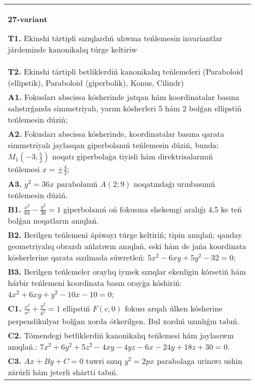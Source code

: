 \documentclass{article}
\begin{document}
\begin{tabular}{m{17cm}}
\textbf{27-variant}
\newline

\textbf{T1.} Ekinshi tártipli sızıqlardıń ulıwma teńlemesin invariantlar járdeminde kanonikalıq túrge keltiriw \\
\textbf{T2.} Ekinshi tártipli betliklerdiń kanonikalıq teńlemeleri (Paraboloid (ellipstik), Paraboloid (giperbolik), Konus, Cilindr) \\
\textbf{A1.} Fokusları abscissa kósherinde jatqan hám koordinatalar basına salıstırǵanda simmetriyalı, yarım kósherleri 5 hám 2 bolǵan ellipstiń teńlemesin dúziń; \\
\textbf{A2.} Fokusları abscissa kósherinde, koordinatalar basına qarata simmetriyalı jaylasqan giperbolanıń teńlemesin dúziń, bunda: $M_1\left(-3; \frac{5}{2}\right)$ noqatı giperbolaģa tiyisli hám direktrisalarınıń teńlemesi $x= \pm \frac{4}{3}$; \\
\textbf{A3.} $y^2=36 x$ parabolanıń $A (2; 9) $ noqatındaǵı urınbasınıń teńlemesin dúziń. \\
\textbf{B1.} $\frac{x^2}{64}-\frac{y^2}{36}=1$ giperbolanıń oń fokusına shekemgi aralıǵı 4,5 ke teń bolǵan noqatların anıqlań. \\
\textbf{B2.} Berilgen teńlemeni ápiwayı túrge keltiriń; tipin anıqlań; qanday geometriyalıq obrazdı ańlatıwın anıqlań, eski hám de jańa koordinata kósherlerine qarata sızılmada súwretleń: $5 x^2-6 x y+5 y^2-32=0$; \\
\textbf{B3.} Berilgen teńlemeler oraylıq iymek sızıqlar ekenligin kórsetiń hám hárbir teńlemeni koordinata basın orayģa kóshiriń: $4 x^2+6 x y+y^2-10 x-10=0$; \\
\textbf{C1.} $\frac{x^2}{a^2}+\frac{y^2}{b^2}=1$ ellipstiń $F(c, 0)$ fokusı arqalı úlken kósherine perpendikulyar bolǵan xorda ótkerilgen. Bul xordıń uzınlıǵın tabıń. \\
\textbf{C2.} Tómendegi betliklerdiń kanonikalıq teńlemesi hám jaylasıwın anıqlań.: $7 x^2+6 y^2+5 z^2-4 x y-4 y z-6 x-24 y+18 z+30=0$. \\
\textbf{C3.} $A x+B y+C=0$ tuwri sızıq $y^2=2 p x$ parabolaga urinıwı ushin zárúrli hám jeterli shártti tabıń. \\

\end{tabular}
\vspace{1cm}
\end{document}
